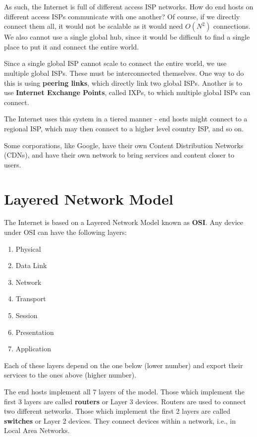 \documentclass[12pt,letterpaper]{book}
\theoremstyle{definition}
\begin{document}
As such, the Internet is full of different access ISP networks. How do end hosts on different access ISPs communicate with one another? Of course, if we directly connect them all, it would not be scalable as it would need $O(N^2)$ connections. We also cannot use a single global hub, since it would be difficult to find a single place to put it and connect the entire world.

Since a single global ISP cannot scale to connect the entire world, we use multiple global ISPs. These must be interconnected themselves. One way to do this is using \textbf{peering links}, which directly link two global ISPs. Another is to use \textbf{Internet Exchange Points}, called IXPs, to which multiple global ISPs can connect.

The Internet uses this system in a tiered manner - end hosts might connect to a regional ISP, which may then connect to a higher level country ISP, and so on.

Some corporations, like Google, have their own Content Distribution Networks (CDNs), and have their own network to bring services and content closer to users.

\section{Layered Network Model}

The Internet is based on a Layered Network Model known as \textbf{OSI}. Any device under OSI can have the following layers:

\begin{enumerate}
  \item Physical
  \item Data Link
  \item Network
  \item Transport
  \item Session
  \item Presentation
  \item Application
\end{enumerate}

Each of these layers depend on the one below (lower number) and export their services to the ones above (higher number).

The end hosts implement all 7 layers of the model. Those which implement the first 3 layers are called \textbf{routers} or Layer 3 devices. Routers are used to connect two different networks. Those which implement the first 2 layers are called \textbf{switches} or Layer 2 devices. They connect devices within a network, i.e., in Local Area Networks.
\end{document}
